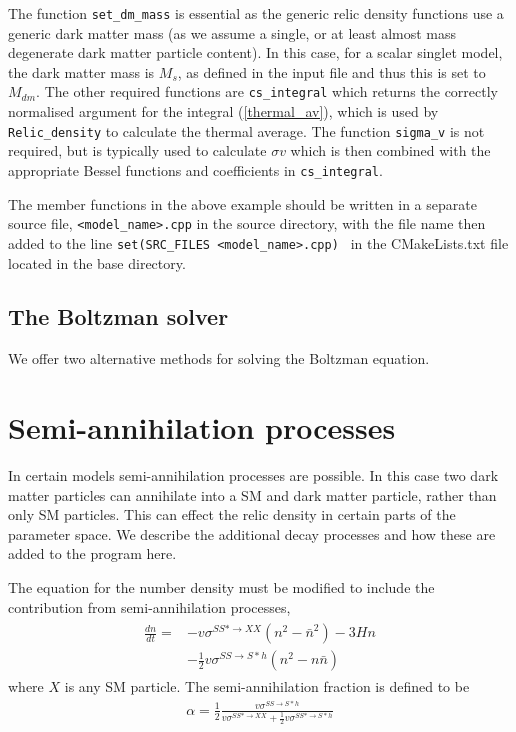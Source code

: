 The function \lstinline{set_dm_mass} is essential as the generic relic density functions use a generic dark matter mass (as we assume a single, or at least almost mass degenerate dark matter particle content).  In this case, for a scalar singlet model, the dark matter mass is $M_s$, as defined in the input file and thus this is set to $M_{dm}$.  The other required functions are \lstinline{cs_integral} which returns the correctly normalised argument for the integral (\ref{thermal_av}), which is used by \lstinline{Relic_density} to calculate the thermal average.  The function \lstinline{sigma_v} is not required, but is typically used to calculate $\sigma v$ which is then combined with the appropriate Bessel functions and coefficients in \lstinline{cs_integral}.

The member functions in the above example should be written in a separate source file, \lstinline{<model_name>.cpp} in the source directory, with the file name then added to the line \lstinline{set(SRC_FILES <model_name>.cpp) } in the CMakeLists.txt file located in the base directory.

\subsection{The Boltzman solver}

We offer two alternative methods for solving the Boltzman equation.



\section{Semi-annihilation processes}

In certain models semi-annihilation processes are possible.  In this case two dark matter particles can annihilate into a SM and dark matter particle, rather than only SM particles.  This can effect the relic density in certain parts of the parameter space.  We describe the additional decay processes and how these are added to the program here.

The equation for the number density must be modified to include the contribution from semi-annihilation processes,
\begin{align}
\begin{split}
\frac{dn}{dt}=&-v\sigma^{SS*\rightarrow XX}(n^2-\bar{n}^2)-3Hn\\
&-\frac{1}{2}v\sigma^{SS\rightarrow S*h}(n^2-n\bar{n})
\end{split}
\end{align}
where $X$ is any SM particle.  The semi-annihilation fraction is defined to be
\begin{align}
\alpha=\frac{1}{2}\frac{v\sigma^{SS\rightarrow S*h}}{v\sigma^{SS*\rightarrow XX}+\frac{1}{2}v\sigma^{SS*\rightarrow S*h}}
\end{align}

